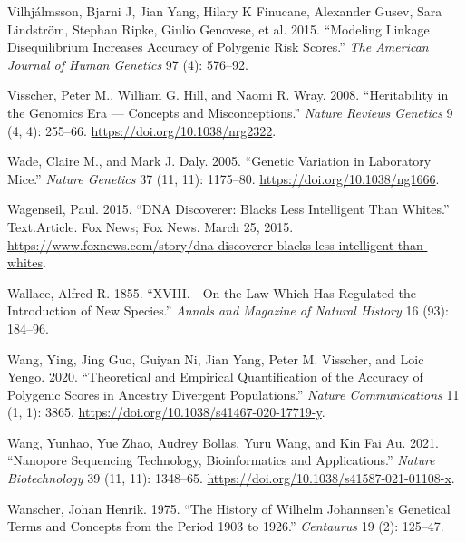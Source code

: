 \documentclass[
]{book}
\newlength{\cslhangindent}
\newlength{\cslentryspacingunit} %
\newenvironment{CSLReferences}[2] %
 {%
  \setlength{\parindent}{0pt}
  \ifodd #1
  \let\oldpar\par
  \def\par{\hangindent=\cslhangindent\oldpar}
  \fi
  \setlength{\parskip}{#2\cslentryspacingunit}
 }%
 {}
\begin{document}
\begin{CSLReferences}{1}{0}
\leavevmode{}%
Vilhjálmsson, Bjarni J, Jian Yang, Hilary K Finucane, Alexander Gusev, Sara Lindström, Stephan Ripke, Giulio Genovese, et al. 2015. {``Modeling Linkage Disequilibrium Increases Accuracy of Polygenic Risk Scores.''} \emph{The American Journal of Human Genetics} 97 (4): 576--92.

\leavevmode{}%
Visscher, Peter M., William G. Hill, and Naomi R. Wray. 2008. {``Heritability in the Genomics Era --- Concepts and Misconceptions.''} \emph{Nature Reviews Genetics} 9 (4, 4): 255--66. \url{https://doi.org/10.1038/nrg2322}.

\leavevmode{}%
Wade, Claire M., and Mark J. Daly. 2005. {``Genetic Variation in Laboratory Mice.''} \emph{Nature Genetics} 37 (11, 11): 1175--80. \url{https://doi.org/10.1038/ng1666}.

\leavevmode{}%
Wagenseil, Paul. 2015. {``{DNA Discoverer}: {Blacks Less Intelligent Than Whites}.''} Text.Article. {Fox News}; {Fox News}. March 25, 2015. \url{https://www.foxnews.com/story/dna-discoverer-blacks-less-intelligent-than-whites}.

\leavevmode{}%
Wallace, Alfred R. 1855. {``{XVIII}.---{On} the Law Which Has Regulated the Introduction of New Species.''} \emph{Annals and Magazine of Natural History} 16 (93): 184--96.

\leavevmode{}%
Wang, Ying, Jing Guo, Guiyan Ni, Jian Yang, Peter M. Visscher, and Loic Yengo. 2020. {``Theoretical and Empirical Quantification of the Accuracy of Polygenic Scores in Ancestry Divergent Populations.''} \emph{Nature Communications} 11 (1, 1): 3865. \url{https://doi.org/10.1038/s41467-020-17719-y}.

\leavevmode{}%
Wang, Yunhao, Yue Zhao, Audrey Bollas, Yuru Wang, and Kin Fai Au. 2021. {``Nanopore Sequencing Technology, Bioinformatics and Applications.''} \emph{Nature Biotechnology} 39 (11, 11): 1348--65. \url{https://doi.org/10.1038/s41587-021-01108-x}.

\leavevmode{}%
Wanscher, Johan Henrik. 1975. {``The History of {Wilhelm Johannsen}'s Genetical Terms and Concepts from the Period 1903 to 1926.''} \emph{Centaurus} 19 (2): 125--47.


\end{CSLReferences}
\end{document}

